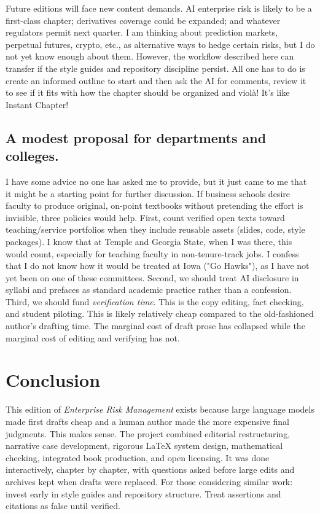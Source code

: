 \documentclass[11pt,letterpaper]{article}
\begin{document}
Future editions will face new content demands. AI enterprise risk is likely to be a first-class chapter; derivatives coverage could be expanded; and whatever regulators permit next quarter. I am thinking about prediction markets, perpetual futures, crypto, etc., as alternative ways to hedge certain risks, but I do not yet know enough about them. However, the workflow described here can transfer if the style guides and repository discipline persist. All one has to do is create an informed outline to start and then ask the AI for comments, review it to see if it fits with how the chapter should be organized and viol\`{a}! It's like Instant Chapter\textregistered!

\subsection{A modest proposal for departments and colleges.}

I have some advice no one has asked me to provide, but it just came to me that it might be a starting point for further discussion. If business schools desire faculty to produce original, on-point textbooks without pretending the effort is invisible, three policies would help. First, count verified open texts toward teaching/service portfolios when they include reusable assets (slides, code, style packages). I know that at Temple and Georgia State, when I was there, this would count, especially for teaching faculty in non-tenure-track jobs. I confess that I do not know how it would be treated at Iowa ("Go Hawks"), as I have not yet been on one of these committees. Second, we should treat AI disclosure in syllabi and prefaces as standard academic practice rather than a confession. Third, we should fund \emph{verification time}. This is the copy editing, fact checking, and student piloting. This is likely relatively cheap compared to the old-fashioned author's drafting time. The marginal cost of draft prose has collapsed while the marginal cost of editing and verifying has not.

\section{Conclusion}

This edition of \textit{Enterprise Risk Management} exists because large language models made first drafts cheap and a human author made the more expensive final judgments. This makes sense. The project combined editorial restructuring, narrative case development, rigorous LaTeX system design, mathematical checking, integrated book production, and open licensing. It was done interactively, chapter by chapter, with questions asked before large edits and archives kept when drafts were replaced. For those considering similar work: invest early in style guides and repository structure. Treat assertions and citations as false until verified. 
\end{document}

